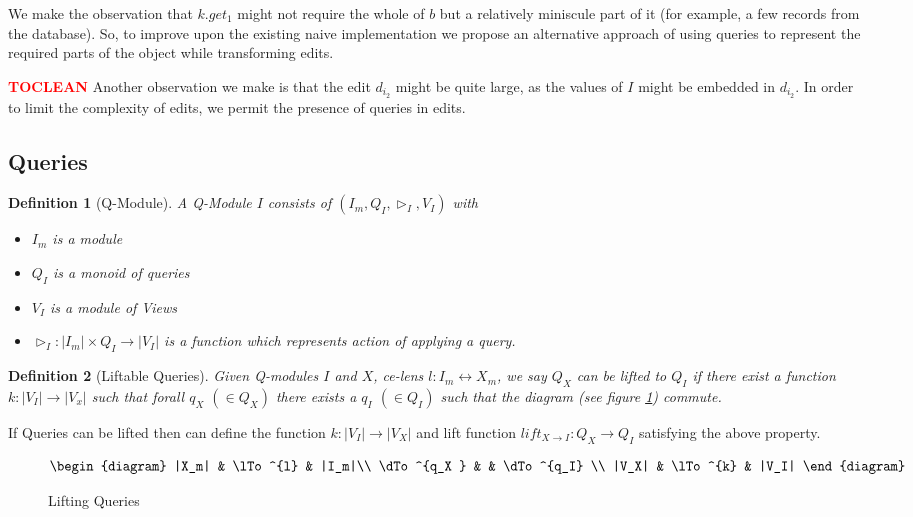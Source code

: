 \documentclass[a4paper,10pt]{article}
\newtheorem{definition}{Definition}
\newcommand{\finish}[1]{#1}
\newcommand{\comment}[1]{\finish{\textbf{\textcolor{red}{#1}}}}
\begin{document}
We make the observation that $k.get_1$
might not require the whole of $b$ but a relatively miniscule
 part of it (for example, a few records from the
database). So, to improve upon the existing naive implementation we
propose an alternative approach of using queries to represent the
required parts of the object while transforming edits. 

\comment{TOCLEAN}
Another observation we make is that the edit $d_{i_2}$ might be quite large, as
the values of $I$ might be embedded in $d_{i_2}$. In order to limit the complexity
of edits, we permit the presence of queries in edits.

\subsection{Queries}
\begin{definition}[Q-Module] A Q-Module $I$ consists of $(I_m,Q_I,\rhd_{I},V_I)$ with
\begin{itemize}
\item $I_m$ is a module
\item $Q_I$ is a monoid of queries
\item $V_I$ is a module of Views
\item $\rhd_{I} : |I_m| \times Q_I \to |V_I|$ is a function which represents action of applying a query.
\end{itemize}
\end{definition} 

\begin{definition}[Liftable Queries]
Given Q-modules $I$ and $X$, ce-lens $l : I_m \leftrightarrow X_m$, we say $Q_X$ can be lifted to $Q_I$ 
if there exist a function $k : |V_I| \to |V_x|$ such that forall $q_X$ $(\in Q_X)$ there exists a $q_I$ $(\in Q_I)$ such that the diagram (see figure \ref{fig:lifting-queries}) commute. 
\end{definition}

If Queries can be lifted then can define the function $k: |V_I|  \to|V_X|$ and lift function $lift_{X \to I}: Q_X \to Q_I$ satisfying the above property. 


\begin{figure}[ht]
\begin{displaymath}
\begin{diagram}
|X_m| & \lTo^{l} & |I_m|\\
\dTo^{q_X } & & \dTo^{q_I} \\
|V_X| & \lTo^{k} & |V_I| 
\end{diagram}
\end{displaymath}
\caption{Lifting Queries}
\label{fig:lifting-queries}
\end{figure}
\end{document}
